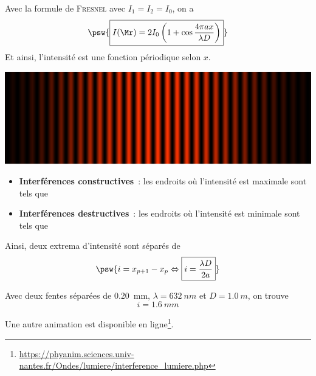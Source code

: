 \documentclass[../../main/main.tex]{subfiles}
\begin{document}
Avec la formule de \textsc{Fresnel} avec $I_1 = I_2 = I_0$, on a
\[\psw{
		\boxed{I(\Mr) = 2I_0 \left( 1 + \cos\frac{4\pi ax}{\lambda D} \right)}
	}\]
Et ainsi, l'intensité est une fonction périodique selon $x$.

\begin{center}
	\includegraphics[scale=1]{young_intensity}
\end{center}

\begin{itemize}
	\item \textbf{Interférences constructives}~: les endroits où l'intensité est
	      maximale sont tels que
	      \vspace{-10pt}
	\item \textbf{Interférences destructives}~: les endroits où l'intensité est
	      minimale sont tels que
	      \vspace{-10pt}
\end{itemize}

Ainsi, deux extrema d'intensité sont séparés de
\[\psw{
		i = x_{p+1} - x_p \Leftrightarrow \boxed{i = \frac{\lambda D}{2a}}
	}\]

Avec deux fentes séparées de \SI{0.20}{mm}, $\lambda = \SI{632}{nm}$ et $D =
	\SI{1.0}{m}$, on trouve
\[\boxed{i = \SI{1.6}{mm}}\]

Une autre animation est disponible en
ligne\footnote{\url{https://phyanim.sciences.univ-nantes.fr/Ondes/lumiere/interference_lumiere.php}}.
\end{document}
